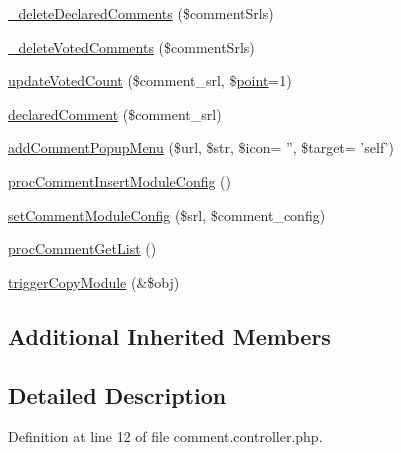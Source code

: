 \begin{DoxyCompactItemize}
\item 
\hyperlink{classcommentController_a06a2f96cd357550dd0cd834d7e61f4bf}{\+\_\+delete\+Declared\+Comments} (\$comment\+Srls)
\item 
\hyperlink{classcommentController_a0e4216451f3bb1c02aeec98bb4f54ddc}{\+\_\+delete\+Voted\+Comments} (\$comment\+Srls)
\item 
\hyperlink{classcommentController_abe720cae94b04ba356b00f80f6880e91}{update\+Voted\+Count} (\$comment\+\_\+srl, \$\hyperlink{classpoint}{point}=1)
\item 
\hyperlink{classcommentController_aaae1e5860a1e170a8fc3142f80bbcde6}{declared\+Comment} (\$comment\+\_\+srl)
\item 
\hyperlink{classcommentController_a27025d0f5cc53f58566493e6e33b924a}{add\+Comment\+Popup\+Menu} (\$url, \$str, \$icon= '', \$target= 'self')
\item 
\hyperlink{classcommentController_ab4a71283244210be754cceb8511e8789}{proc\+Comment\+Insert\+Module\+Config} ()
\item 
\hyperlink{classcommentController_a3e4d45ad61f74541e1182c29924b625d}{set\+Comment\+Module\+Config} (\$srl, \$comment\+\_\+config)
\item 
\hyperlink{classcommentController_ac9edb9826c8b07ceb1a4db29c5db514a}{proc\+Comment\+Get\+List} ()
\item 
\hyperlink{classcommentController_a5cf1c177c5cbdd0556363a0204d92f5f}{trigger\+Copy\+Module} (\&\$obj)
\end{DoxyCompactItemize}
\subsection*{Additional Inherited Members}


\subsection{Detailed Description}


Definition at line 12 of file comment.\+controller.\+php.




